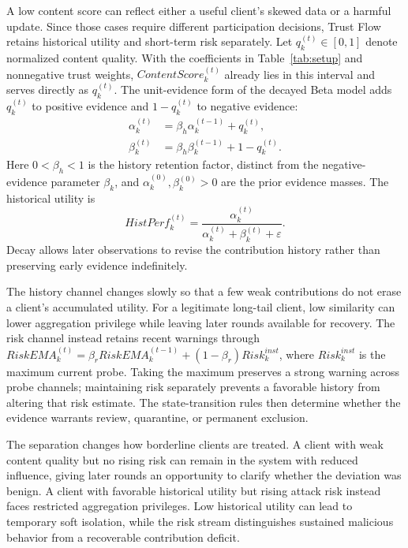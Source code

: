 \documentclass[conference,compsoc]{IEEEtran}
\begin{document}
A low content score can reflect either a useful client's skewed data or a harmful update. Since those cases require different participation decisions, Trust Flow retains historical utility and short-term risk separately. Let $q_k^{(t)}\in[0,1]$ denote normalized content quality. With the coefficients in Table~\ref{tab:setup} and nonnegative trust weights, $ContentScore_k^{(t)}$ already lies in this interval and serves directly as $q_k^{(t)}$. The unit-evidence form of the decayed Beta model adds $q_k^{(t)}$ to positive evidence and $1-q_k^{(t)}$ to negative evidence:
\begin{equation}
    \begin{aligned}
        \alpha_k^{(t)} &= \beta_h\alpha_k^{(t-1)}+q_k^{(t)},\\
        \beta_k^{(t)} &= \beta_h\beta_k^{(t-1)}+1-q_k^{(t)}.
    \end{aligned}
\end{equation}
Here $0<\beta_h<1$ is the history retention factor, distinct from the negative-evidence parameter $\beta_k$, and $\alpha_k^{(0)},\beta_k^{(0)}>0$ are the prior evidence masses. The historical utility is
\begin{equation}
    HistPerf_k^{(t)}=\frac{\alpha_k^{(t)}}{\alpha_k^{(t)}+\beta_k^{(t)}+\varepsilon}.
\end{equation}
Decay allows later observations to revise the contribution history rather than preserving early evidence indefinitely.

The history channel changes slowly so that a few weak contributions do not erase a client's accumulated utility. For a legitimate long-tail client, low similarity can lower aggregation privilege while leaving later rounds available for recovery. The risk channel instead retains recent warnings through $RiskEMA_k^{(t)}=\beta_rRiskEMA_k^{(t-1)}+(1-\beta_r)Risk_k^{inst}$, where $Risk_k^{inst}$ is the maximum current probe. Taking the maximum preserves a strong warning across probe channels; maintaining risk separately prevents a favorable history from altering that risk estimate. The state-transition rules then determine whether the evidence warrants review, quarantine, or permanent exclusion.

The separation changes how borderline clients are treated. A client with weak content quality but no rising risk can remain in the system with reduced influence, giving later rounds an opportunity to clarify whether the deviation was benign. A client with favorable historical utility but rising attack risk instead faces restricted aggregation privileges. Low historical utility can lead to temporary soft isolation, while the risk stream distinguishes sustained malicious behavior from a recoverable contribution deficit.
\end{document}

